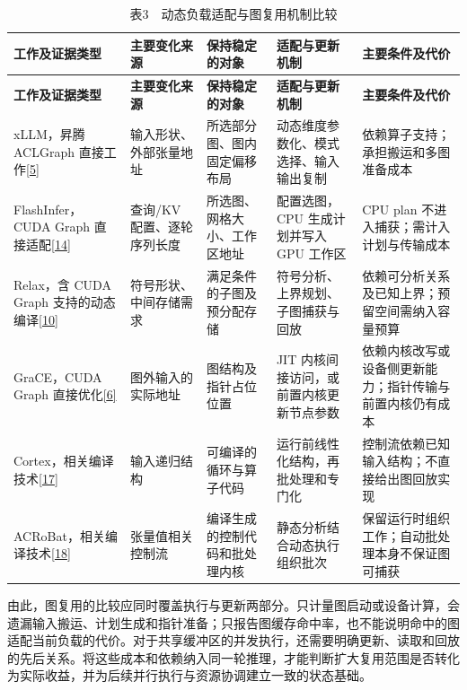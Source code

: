 \documentclass[UTF8,11pt,fontset=windows]{ctexart}
\begin{document}
\begingroup\small
\begin{longtable}[]{@{}>{\raggedright\arraybackslash}p{}>{\raggedright\arraybackslash}p{}>{\raggedright\arraybackslash}p{}>{\raggedright\arraybackslash}p{}>{\raggedright\arraybackslash}p{}@{}}
\caption{表3　动态负载适配与图复用机制比较}\tabularnewline
\toprule
\textbf{工作及证据类型} & \textbf{主要变化来源} & \textbf{保持稳定的对象} & \textbf{适配与更新机制} & \textbf{主要条件及代价} \\
\midrule
\endfirsthead
\toprule
\textbf{工作及证据类型} & \textbf{主要变化来源} & \textbf{保持稳定的对象} & \textbf{适配与更新机制} & \textbf{主要条件及代价} \\
\midrule
\endhead
xLLM，昇腾 ACLGraph 直接工作\protect\hyperlink{ref-5}{{[}5{]}} & 输入形状、外部张量地址 & 所选部分图、图内固定偏移布局 & 动态维度参数化、模式选择、输入输出复制 & 依赖算子支持；承担搬运和多图准备成本 \\
FlashInfer，CUDA Graph 直接适配\protect\hyperlink{ref-14}{{[}14{]}} & 查询/KV 配置、逐轮序列长度 & 所选图、网格大小、工作区地址 & 配置选图，CPU 生成计划并写入 GPU 工作区 & CPU plan 不进入捕获；需计入计划与传输成本 \\
Relax，含 CUDA Graph 支持的动态编译\protect\hyperlink{ref-10}{{[}10{]}} & 符号形状、中间存储需求 & 满足条件的子图及预分配存储 & 符号分析、上界规划、子图捕获与回放 & 依赖可分析关系及已知上界；预留空间需纳入容量预算 \\
GraCE，CUDA Graph 直接优化\protect\hyperlink{ref-6}{{[}6{]}} & 图外输入的实际地址 & 图结构及指针占位位置 & JIT 内核间接访问，或前置内核更新节点参数 & 依赖内核改写或设备侧更新能力；指针传输与前置内核仍有成本 \\
Cortex，相关编译技术\protect\hyperlink{ref-17}{{[}17{]}} & 输入递归结构 & 可编译的循环与算子代码 & 运行前线性化结构，再批处理和专门化 & 控制流依赖已知输入结构；不直接给出图回放实现 \\
ACRoBat，相关编译技术\protect\hyperlink{ref-18}{{[}18{]}} & 张量值相关控制流 & 编译生成的控制代码和批处理内核 & 静态分析结合动态执行组织批次 & 保留运行时组织工作；自动批处理本身不保证图可捕获 \\
\bottomrule
\end{longtable}
\endgroup

由此，图复用的比较应同时覆盖执行与更新两部分。只计量图启动或设备计算，会遗漏输入搬运、计划生成和指针准备；只报告图缓存命中率，也不能说明命中的图适配当前负载的代价。对于共享缓冲区的并发执行，还需要明确更新、读取和回放的先后关系。将这些成本和依赖纳入同一轮推理，才能判断扩大复用范围是否转化为实际收益，并为后续并行执行与资源协调建立一致的状态基础。
\end{document}

